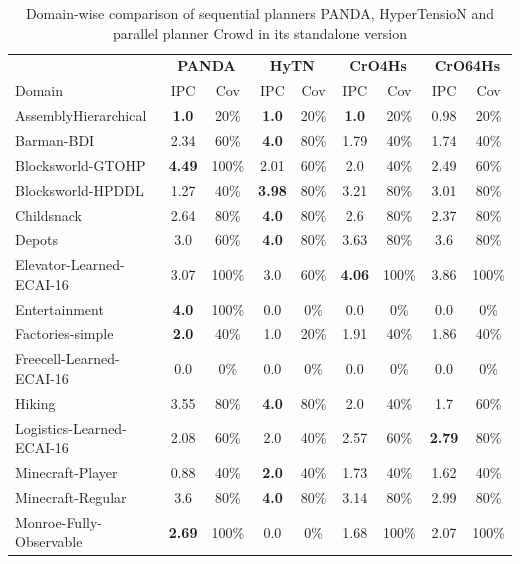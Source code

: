 \begin{table}
	\caption{Domain-wise comparison of sequential planners PANDA, HyperTensioN and parallel planner Crowd in its standalone version}
	\label{table: results old}
	\centering
	\begin{adjustbox}{angle=90}

\begin{tabular}{|l|cc|cc|cc|cc|}
	\hline
	& \multicolumn{2}{c|}{\textbf{PANDA}} & \multicolumn{2}{c|}{\textbf{HyTN}} & \multicolumn{2}{c|}{\textbf{CrO4Hs}} & \multicolumn{2}{c|}{\textbf{CrO64Hs}}\\
	Domain & IPC & Cov & IPC & Cov & IPC & Cov & IPC & Cov\\
	\hline
	AssemblyHierarchical & \textbf{1.0} & 20\%  & \textbf{1.0} & 20\%  & \textbf{1.0} & 20\%  & 0.98 & 20\%  \\
	Barman-BDI & 2.34 & 60\%  & \textbf{4.0} & 80\%  & 1.79 & 40\%  & 1.74 & 40\%  \\
	Blocksworld-GTOHP & \textbf{4.49} & 100\%  & 2.01 & 60\%  & 2.0 & 40\%  & 2.49 & 60\%  \\
	Blocksworld-HPDDL & 1.27 & 40\%  & \textbf{3.98} & 80\%  & 3.21 & 80\%  & 3.01 & 80\%  \\
	Childsnack & 2.64 & 80\%  & \textbf{4.0} & 80\%  & 2.6 & 80\%  & 2.37 & 80\%  \\
	Depots & 3.0 & 60\%  & \textbf{4.0} & 80\%  & 3.63 & 80\%  & 3.6 & 80\%  \\
	Elevator-Learned-ECAI-16 & 3.07 & 100\%  & 3.0 & 60\%  & \textbf{4.06} & 100\%  & 3.86 & 100\%  \\
	Entertainment & \textbf{4.0} & 100\%  & 0.0 & 0\%  & 0.0 & 0\%  & 0.0 & 0\%  \\
	Factories-simple & \textbf{2.0} & 40\%  & 1.0 & 20\%  & 1.91 & 40\%  & 1.86 & 40\%  \\
	Freecell-Learned-ECAI-16 & 0.0 & 0\%  & 0.0 & 0\%  & 0.0 & 0\%  & 0.0 & 0\%  \\
	Hiking & 3.55 & 80\%  & \textbf{4.0} & 80\%  & 2.0 & 40\%  & 1.7 & 60\%  \\
	Logistics-Learned-ECAI-16 & 2.08 & 60\%  & 2.0 & 40\%  & 2.57 & 60\%  & \textbf{2.79} & 80\%  \\
	Minecraft-Player & 0.88 & 40\%  & \textbf{2.0} & 40\%  & 1.73 & 40\%  & 1.62 & 40\%  \\
	Minecraft-Regular & 3.6 & 80\%  & \textbf{4.0} & 80\%  & 3.14 & 80\%  & 2.99 & 80\%  \\
	Monroe-Fully-Observable & \textbf{2.69} & 100\%  & 0.0 & 0\%  & 1.68 & 100\%  & 2.07 & 100\%  \\

\end{tabular}
\end{adjustbox}
\end{table}
